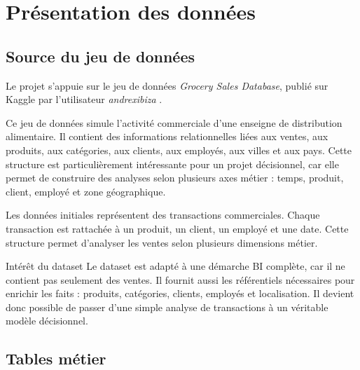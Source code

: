 \documentclass[12pt,a4paper,twoside]{report}
\begin{document}
\chapter{Présentation des données}

\section{Source du jeu de données}

Le projet s'appuie sur le jeu de données \textit{Grocery Sales Database}, publié sur Kaggle par l'utilisateur \textit{andrexibiza} \cite{andrexibiza2024grocery}.

Ce jeu de données simule l'activité commerciale d'une enseigne de distribution alimentaire. Il contient des informations relationnelles liées aux ventes, aux produits, aux catégories, aux clients, aux employés, aux villes et aux pays. Cette structure est particulièrement intéressante pour un projet décisionnel, car elle permet de construire des analyses selon plusieurs axes métier : temps, produit, client, employé et zone géographique.

Les données initiales représentent des transactions commerciales. Chaque transaction est rattachée à un produit, un client, un employé et une date. Cette structure permet d'analyser les ventes selon plusieurs dimensions métier.

\begin{infobox}{Intérêt du dataset}
Le dataset est adapté à une démarche BI complète, car il ne contient pas seulement des ventes. Il fournit aussi les référentiels nécessaires pour enrichir les faits : produits, catégories, clients, employés et localisation. Il devient donc possible de passer d'une simple analyse de transactions à un véritable modèle décisionnel.
\end{infobox}

\section{Tables métier}
\end{document}
